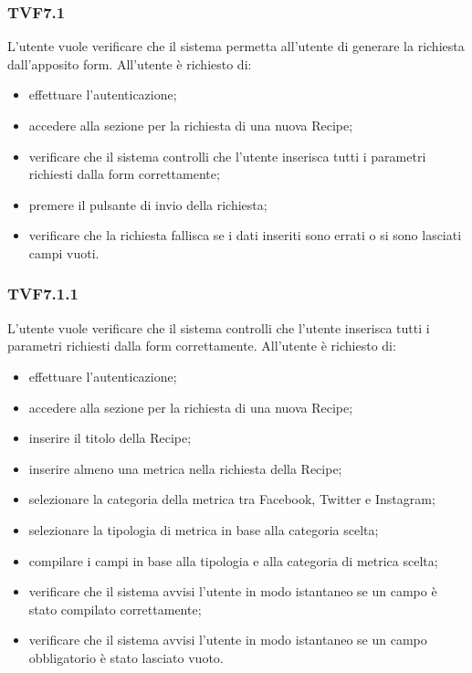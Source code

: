 		\subsubsection{TVF7.1}
			L'utente vuole verificare che il sistema permetta all'utente di generare la richiesta dall'apposito form. All'utente è richiesto di:
			\begin{itemize}
				\item effettuare l'autenticazione;
				\item accedere alla sezione per la richiesta di una nuova Recipe;
				\item verificare che il sistema controlli che l'utente inserisca tutti i parametri richiesti dalla form correttamente;
				\item premere il pulsante di invio della richiesta;
				\item verificare che la richiesta fallisca se i dati inseriti sono errati o si sono lasciati campi vuoti.
			\end{itemize}
			
		\subsubsection{TVF7.1.1}
			L'utente vuole verificare che il sistema controlli che l'utente inserisca tutti i parametri richiesti dalla form correttamente. All'utente è richiesto di:
			\begin{itemize}
				\item effettuare l'autenticazione;
				\item accedere alla sezione per la richiesta di una nuova Recipe;
				\item inserire il titolo della Recipe;
				\item inserire almeno una metrica nella richiesta della Recipe;
				\item selezionare la categoria della metrica tra Facebook, Twitter e Instagram;
				\item selezionare la tipologia di metrica in base alla categoria scelta;
				\item compilare i campi in base alla tipologia e alla categoria di metrica scelta;
				\item verificare che il sistema avvisi l'utente in modo istantaneo se un campo è stato compilato correttamente;
				\item verificare che il sistema avvisi l'utente in modo istantaneo se un campo obbligatorio è stato lasciato vuoto.
			\end{itemize}
			
